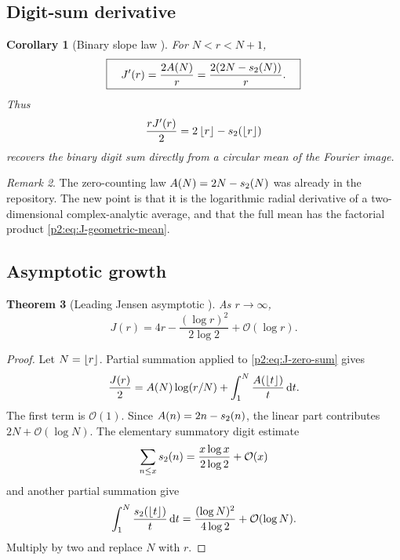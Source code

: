 \documentclass[11pt]{article}
\newtheorem{theorem}{Theorem}[section]
\newtheorem{corollary}[theorem]{Corollary}
\theoremstyle{definition}
\theoremstyle{remark}
\newtheorem{remark}[theorem]{Remark}
\newcommand{\dd}{\,\mathrm d}
\newcommand{\bigO}{\mathcal O}
\begin{document}
\subsection{Digit-sum derivative}

\begin{corollary}[Binary slope law \New]
For $N<r<N+1$,
\begin{equation}
 \boxed{\quad
 J'(r)=\frac{2A(N)}r
 =\frac{2(2N-s_2(N))}{r}.
 \quad}                                                  \label{p2:eq:J-derivative}
\end{equation}
Thus
\begin{equation}
 \frac{rJ'(r)}2=2\left\lfloor r\right\rfloor-s_2(\left\lfloor r\right\rfloor)                  \label{p2:eq:J-digit-recovery}
\end{equation}
recovers the binary digit sum directly from a circular mean of the Fourier image.
\end{corollary}

\begin{remark}
The zero-counting law $A(N)=2N-s_2(N)$ was already in the repository.  The new point is that
it is the logarithmic radial derivative of a two-dimensional complex-analytic average, and
that the full mean has the factorial product \eqref{p2:eq:J-geometric-mean}.
\end{remark}

\subsection{Asymptotic growth}

\begin{theorem}[Leading Jensen asymptotic \New]
As $r\to\infty$,
\begin{equation}
 \boxed{\quad
 J(r)=4r-\frac{(\log r)^2}{2\log2}+\bigO(\log r).
 \quad}                                                  \label{p2:eq:J-asymptotic}
\end{equation}
\end{theorem}

\begin{proof}
Let $N=\left\lfloor r\right\rfloor$.  Partial summation applied to \eqref{p2:eq:J-zero-sum} gives
\[
 \frac{J(r)}2=A(N)\log(r/N)
 +\int_1^N\frac{A(\floor t)}{t}\dd t.
\]
The first term is $\bigO(1)$.  Since
$A(n)=2n-s_2(n)$, the linear part contributes $2N+\bigO(\log N)$.  The elementary
summatory digit estimate
\[
 \sum_{n\le x}\wtPartx(n)=\frac{x\log x}{2\log2}+\bigO(x)
\]
and another partial summation give
\[
 \int_1^N\frac{\wtPartx(\floor t)}{t}\dd t
 =\frac{(\log N)^2}{4\log2}+\bigO(\log N).
\]
Multiply by two and replace $N$ with $r$.
\end{proof}
\end{document}
